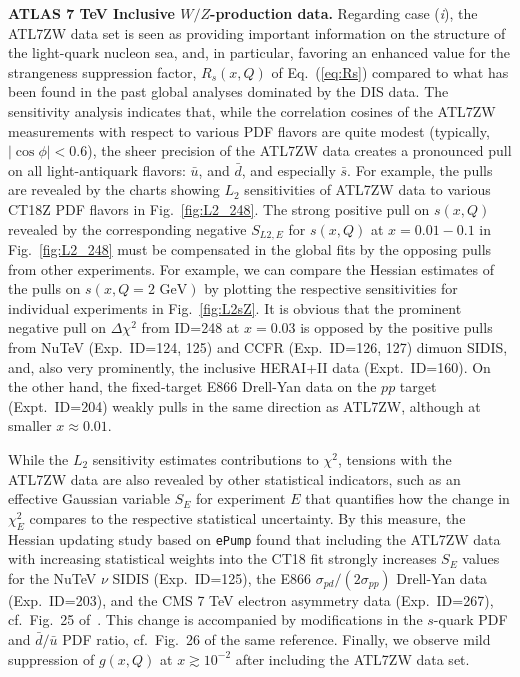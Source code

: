 {\bf ATLAS 7 TeV Inclusive $W/Z$-production data.}
%
%
Regarding case ({\it i}), the ATL7ZW data set is seen as providing
important information on the structure of the light-quark nucleon sea,
and, in particular, favoring an enhanced value for the strangeness
suppression factor, $R_s(x,Q)$ of Eq.~(\ref{eq:Rs})
compared to what has been found in the past global analyses
dominated by the DIS data.
The sensitivity analysis indicates that, while
the correlation cosines of the ATL7ZW measurements
with respect to various PDF flavors are quite modest
(typically, $|\cos \phi|\! <\! 0.6$), the sheer precision of the
ATL7ZW data creates a pronounced
pull on all light-antiquark flavors: $\bar u$, and $\bar d$, and
especially $\bar s$. For example, the pulls are revealed by the charts
showing $L_2$ sensitivities of ATL7ZW data to various CT18Z PDF flavors
in Fig.~\ref{fig:L2_248}. The strong positive pull on $s(x,Q)$
revealed by the corresponding negative $S_{L2,E}$ for $s(x,Q)$
at $x=0.01-0.1$ in Fig.~\ref{fig:L2_248} must be compensated in the
global fits by the
opposing pulls from other experiments. For example, we can compare
the Hessian estimates of the pulls on $s(x,Q=2\mbox{ GeV})$
by plotting the respective sensitivities for individual
experiments in Fig.~\ref{fig:L2sZ}. It is obvious that the prominent
negative pull on $\Delta \chi^2$ from ID=248 at $x=0.03$ is opposed by
the positive pulls from NuTeV (Exp.~ID=124, 125) and CCFR
(Exp.~ID=126, 127) dimuon SIDIS, and, also very prominently, the
inclusive HERAI+II data (Expt.~ID=160). On the other hand, the
fixed-target E866 Drell-Yan data on the $pp$ target (Expt.~ID=204)
weakly pulls in the same direction as ATL7ZW, although at smaller
$x \approx 0.01$.

While the $L_2$ sensitivity estimates contributions
to $\chi^2$, tensions with the ATL7ZW data are also revealed by other
statistical indicators, such as an effective Gaussian variable $S_E$
for experiment $E$ that quantifies how the change in $\chi^2_E$
compares to the respective statistical uncertainty. By this measure, 
the Hessian updating study \cite{Hou:2019gfw} based on \texttt{ePump} 
found that including the ATL7ZW data with
increasing statistical weights into the CT18 fit strongly increases
$S_E$ values for the NuTeV $\nu$ SIDIS (Exp.~ID=125),
the E866 $\sigma_{pd}/(2\sigma_{pp})$ Drell-Yan data (Exp.~ID=203),
and the CMS 7 TeV electron asymmetry data (Exp.~ID=267),
cf.~Fig.~25 of~\cite{Hou:2019gfw}. This change is accompanied by
modifications in the $s$-quark PDF and $\bar{d}/\bar{u}$ PDF ratio,
cf.~Fig.~26 of the same reference. Finally, we observe mild
suppression of $g(x,Q)$ at $x \gtrsim 10^{-2}$ after including the
ATL7ZW data set.

